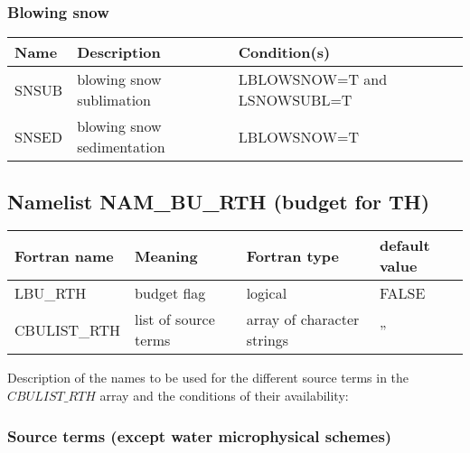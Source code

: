 \subsubsection{Blowing snow}

\begin{longtable} {|p{}|p{}|p{}|}
\hline
Name & Description & Condition(s) \\
\hline \hline
\endhead
SNSUB & blowing snow sublimation   & LBLOWSNOW=T and LSNOWSUBL=T \\\hline
SNSED & blowing snow sedimentation & LBLOWSNOW=T \\\hline
\end{longtable}


\subsection{Namelist NAM\_BU\_RTH (budget for TH)}

\begin{longtable} {|p{}|p{}|>{\centering}p{}|p{}<{\centering}|}
\hline
Fortran name & Meaning & Fortran type & default value \\
\hline \hline
\endhead
LBU\_RTH & budget flag & logical & FALSE\index{LBU\_RTH!\innam{NAM\_BU\_RTH}} \\\hline
CBULIST\_RTH & list of source terms & array of character strings & ''\index{CBULIST\_RTH!\innam{NAM\_BU\_RTH}} \\\hline
\end{longtable}

Description of the names to be used for the different source terms in the $CBULIST\_RTH$ array and the conditions of their availability:

\subsubsection{Source terms (except water microphysical schemes)}

